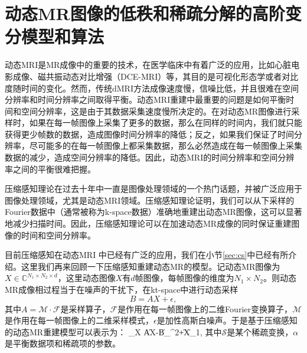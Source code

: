 
\chapter{动态MR图像的低秩和稀疏分解的高阶变分模型和算法}
\label{chap:tgvlr}
动态MRI是MR成像中的重要的技术，在医学临床中有着广泛的应用，比如心脏电影成像、磁共振动态对比增强（DCE-MRI）\cite{Yankeelov2009}等，其目的是可视化形态学或者对比度随时间的变化。然而，传统dMRI方法成像速度慢，信噪比低，并且很难在空间分辨率和时间分辨率之间取得平衡\cite{van1993, Jeffrey2003k}。动态MRI重建中最重要的问题是如何平衡时间和空间分辨率，这是由于其数据采集速度慢所决定的。在对动态MR图像进行采样时，如果在每一帧图像上采集了更多的数据，那么在同样的时间内，我们就只能获得更少帧数的数据，造成图像时间分辨率的降低；反之，如果我们保证了时间分辨率，尽可能多的在每一帧图像上都采集数据，那么必然造成在每一帧图像上采集数据的减少，造成空间分辨率的降低。因此，动态MRI的时间分辨率和空间分辨率之间的平衡很难把握。

压缩感知理论\cite{Candes2006Robust}\cite{Donoho2006Compressed}在过去十年中一直是图像处理领域的一个热门话题，并被广泛应用于图像处理领域，尤其是动态MRI\cite{lustig2006,zhaobo,Sajan2011Accelerated,dmrics,kalman,lpluss,han}领域。压缩感知理论证明，我们可以从下采样的Fourier数据中（通常被称为k-space数据）准确地重建出动态MR图像，这可以显著地减少扫描时间\cite{lustig2006, Lustig2008Compressed}。因此，压缩感知理论可以在加速动态MR成像的同时保证重建图像的时间和空间分辨率。

目前压缩感知在动态MRI\cite{zhaobo,Sajan2011Accelerated,dmrics,kalman,lpluss} 中已经有广泛的应用，我们在小节\ref{sec:cs}中已经有所介绍。这里我们再来回顾一下压缩感知重建动态MR的模型。记动态MR图像为$X\in \mathbb{C}^{N_1\times N_2\times d}$，这里动态图像$X$有$d$帧图像，每帧图像的维度为$N_1\times N_2$。则动态MR成像相过程当于在噪声的干扰下，在kt-space中进行动态采样
$$B=AX+\epsilon,$$
其中$A=\mathcal{M}\cdot\mathcal{F}$是采样算子，$\mathcal{F}$是作用在每一帧图像上的二维Fourier变换算子，$\mathcal{M}$是作用在每一帧图像上的二维采样模式，$\epsilon$是加性高斯白噪声。于是基于压缩感知的动态MR重建模型可以表示为：
\beq
\min_X \|AX-B\|_{}^2+\alpha\|X\|_1,
\eeq
其中$\mathcal{S}$是某个稀疏变换，$\alpha$是平衡数据项和稀疏项的参数。

